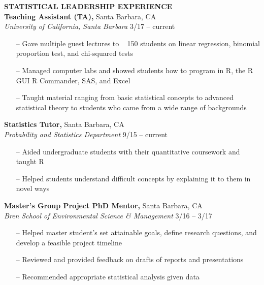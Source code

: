 \begin{vitae}
\textbf{\uppercase{STATISTICAL LEADERSHIP EXPERIENCE}} \\
\textbf{Teaching Assistant (TA),} Santa Barbara, CA \\
\textit{University of California, Santa Barbara}
\hfill
3/17 – current
\vspace{-\topsep}
\begin{itemize}
\setlength{\parskip}{0pt}
\setlength{\itemsep}{0pt plus 1pt}
\item[--] Gave multiple guest lectures to ~ 150 students on linear regression, binomial proportion test, and chi-squared tests
\item[--] Managed computer labs and showed students how to program in R, the R GUI R Commander, SAS, and Excel
\item[--] Taught material ranging from basic statistical concepts to advanced statistical theory to students who came from a wide range of backgrounds
\end{itemize}
\vspace{-\topsep}

\textbf{Statistics Tutor,} Santa Barbara, CA \\
\textit{Probability and Statistics Department}		
\hfill
9/15 – current
\vspace{-\topsep}
\begin{itemize}
\setlength{\parskip}{0pt}
\setlength{\itemsep}{0pt plus 1pt}
\item[--] Aided undergraduate students with their quantitative coursework and taught R
\item[--] Helped students understand difficult concepts by explaining it to them in novel ways
\end{itemize}
\vspace{-\topsep}

\textbf{Master’s Group Project PhD Mentor,} Santa Barbara, CA \\
\textit{Bren School of Environmental Science \& Management}
\hfill
3/16 – 3/17
\vspace{-\topsep}
\begin{itemize}
\setlength{\parskip}{0pt}
\setlength{\itemsep}{0pt plus 1pt}
\item[--] Helped master student’s set attainable goals, define research questions, and develop a feasible project timeline
\item[--] Reviewed and provided feedback on drafts of reports and presentations
\item[--] Recommended appropriate statistical analysis given data
\end{itemize}
\vspace{-\topsep}


\end{vitae}
